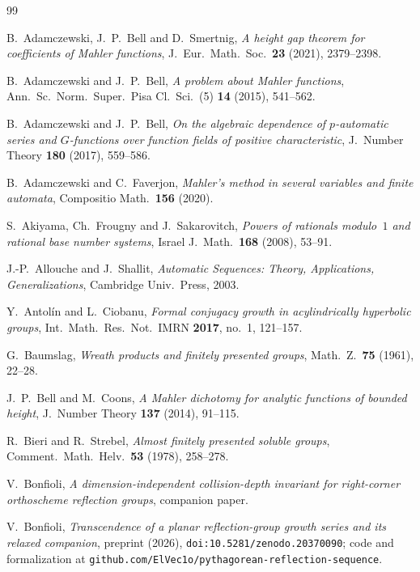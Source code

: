 \documentclass[11pt]{article}
\theoremstyle{plain}
\theoremstyle{definition}
\theoremstyle{remark}
\begin{document}
\begin{thebibliography}{99}

 B.~Adamczewski, J.~P.~Bell and D.~Smertnig, \emph{A height gap theorem for
coefficients of Mahler functions}, J.\ Eur.\ Math.\ Soc.\ \textbf{23} (2021), 2379--2398.

 B.~Adamczewski and J.~P.~Bell, \emph{A problem about Mahler
functions}, Ann.\ Sc.\ Norm.\ Super.\ Pisa Cl.\ Sci.\ (5) \textbf{14} (2015), 541--562.

 B.~Adamczewski and J.~P.~Bell, \emph{On the algebraic dependence
of $p$-automatic series and $G$-functions over function fields of positive characteristic},
J.\ Number Theory \textbf{180} (2017), 559--586.

 B.~Adamczewski and C.~Faverjon, \emph{Mahler's method in several
variables and finite automata}, Compositio Math.\ \textbf{156} (2020).

 S.~Akiyama, Ch.~Frougny and J.~Sakarovitch, \emph{Powers of rationals
modulo~$1$ and rational base number systems}, Israel J.\ Math.\ \textbf{168} (2008), 53--91.

 J.-P.~Allouche and J.~Shallit, \emph{Automatic Sequences: Theory,
Applications, Generalizations}, Cambridge Univ.\ Press, 2003.

 Y.~Antol\'in and L.~Ciobanu, \emph{Formal conjugacy growth in
acylindrically hyperbolic groups}, Int.\ Math.\ Res.\ Not.\ IMRN \textbf{2017}, no.~1,
121--157.

 G.~Baumslag, \emph{Wreath products and finitely presented groups},
Math.\ Z.\ \textbf{75} (1961), 22--28.

 J.~P.~Bell and M.~Coons, \emph{A Mahler dichotomy for analytic functions
of bounded height}, J.\ Number Theory \textbf{137} (2014), 91--115.

 R.~Bieri and R.~Strebel, \emph{Almost finitely presented soluble
groups}, Comment.\ Math.\ Helv.\ \textbf{53} (1978), 258--278.

 V.~Bonfioli, \emph{A dimension-independent collision-depth invariant for
right-corner orthoscheme reflection groups}, companion paper.

 V.~Bonfioli, \emph{Transcendence of a planar reflection-group growth
series and its relaxed companion}, preprint (2026), \texttt{doi:10.5281/zenodo.20370090}; code
and formalization at \texttt{github.com/ElVec1o/pythagorean-reflection-sequence}.


\end{thebibliography}
\end{document}
